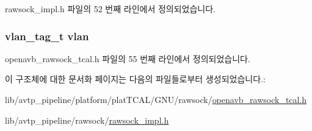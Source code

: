 rawsock\+\_\+impl.\+h 파일의 52 번째 라인에서 정의되었습니다.

\subsubsection[{\texorpdfstring{vlan}{vlan}}]{\setlength{\rightskip}{0pt plus 5cm}vlan\+\_\+tag\+\_\+t vlan}\hypertarget{struct____attribute_____a79672b379015abfaff45c2fb6b7e0669}{}\label{struct____attribute_____a79672b379015abfaff45c2fb6b7e0669}


openavb\+\_\+rawsock\+\_\+tcal.\+h 파일의 55 번째 라인에서 정의되었습니다.



이 구조체에 대한 문서화 페이지는 다음의 파일들로부터 생성되었습니다.\+:\begin{DoxyCompactItemize}
\item 
lib/avtp\+\_\+pipeline/platform/plat\+T\+C\+A\+L/\+G\+N\+U/rawsock/\hyperlink{openavb__rawsock__tcal_8h}{openavb\+\_\+rawsock\+\_\+tcal.\+h}\item 
lib/avtp\+\_\+pipeline/rawsock/\hyperlink{rawsock__impl_8h}{rawsock\+\_\+impl.\+h}\end{DoxyCompactItemize}
